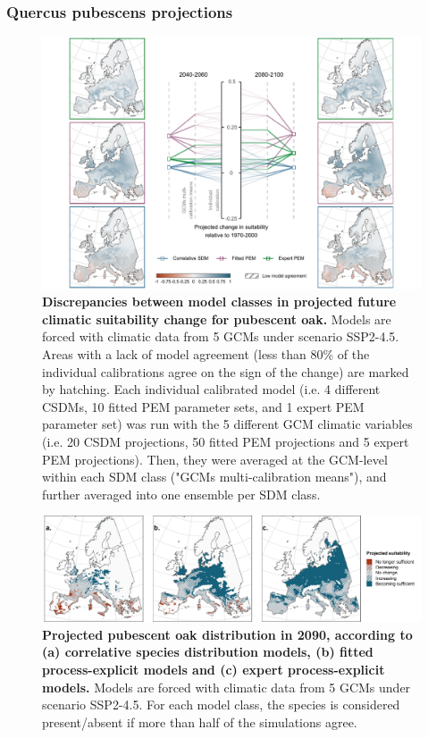 \clearpage

\subsubsection{Quercus pubescens projections}

\begin{figure}[htpb]
\centering
\includegraphics{chapter4/figs/quercuspubescens_cascade-1.pdf}
\caption{\textbf{Discrepancies between model classes in projected future climatic suitability change for pubescent oak.} Models are forced with climatic data from 5 GCMs under scenario SSP2-4.5. Areas with a lack of model agreement (less than 80\% of the individual calibrations agree on the sign of the change) are marked by hatching. Each individual calibrated model (i.e. 4 different CSDMs, 10 fitted PEM parameter sets, and 1 expert PEM parameter set) was run with the 5 different GCM climatic variables (i.e. 20 CSDM projections, 50 fitted PEM projections and 5 expert PEM projections). Then, they were averaged at the GCM-level within each SDM class ("GCMs multi-calibration means"), and further averaged into one ensemble per SDM class.}
\label{app:qpubproj}
\end{figure}

\begin{figure}[htpb]
\centering
\vspace*{-0.2cm}
\includegraphics{chapter4/figs/quercuspubescens_distributions-1.pdf}
\caption{\textbf{Projected pubescent oak distribution in 2090, according to (a) correlative species distribution models, (b) fitted process-explicit models and (c) expert process-explicit models.} Models are forced with climatic data from 5 GCMs under scenario SSP2-4.5. For each model class, the species is considered present/absent if more than half of the simulations agree.}
\label{app:qpubdist}
\vspace*{-6cm}
\end{figure}

